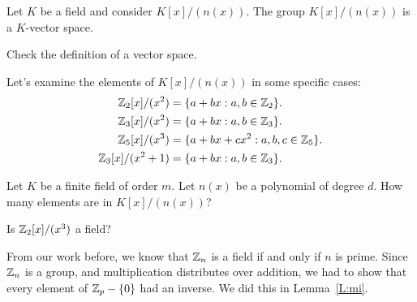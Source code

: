 \documentclass{ximera}
\begin{document}
\begin{lemma}\label{L:mpvs}
  Let $K$ be a field and consider $K[x]/(n(x))$. The group
  $K[x]/(n(x))$ is a $K$-vector space.
  \begin{sketch}
    Check the definition of a vector space.
  \end{sketch}
\end{lemma}


\begin{example}
  Let's examine the elements of $K[x]/(n(x))$ in some specific cases:
  \begin{align*}
    \mathbb Z_2[x]/(x^2) &= \{a + b x: a,b\in \mathbb Z_2\}.\\
    \mathbb Z_3[x]/(x^2) &= \{a + b x: a,b\in \mathbb Z_3\}.\\
    \mathbb Z_5[x]/(x^3) &= \{a + b x + c x^2: a,b,c\in \mathbb Z_5\}.\\
    \mathbb Z_3[x]/(x^2+1) &= \{a + b x: a,b\in \mathbb Z_3\}.
  \end{align*}
\end{example}

\begin{exercise}
  Let $K$ be a finite field of order $m$. Let $n(x)$ be a polynomial
  of degree $d$. How many elements are in $K[x]/(n(x))$?
\end{exercise}


\begin{exercise}
  Is $\mathbb Z_2[x]/(x^3)$ a field?
\end{exercise}




From our work before, we know that $\mathbb Z_n$ is a field if and only if
$n$ is prime. Since $\mathbb Z_n$ is a group, and multiplication distributes
over addition, we had to show that every element of $\mathbb Z_p-\{0\}$ had
an inverse. We did this in Lemma~\ref{L:mi}.
\end{document}
